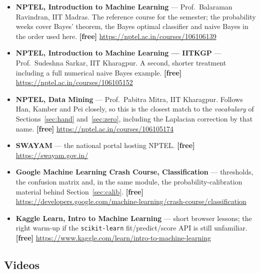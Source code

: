 \documentclass[11pt]{article}
\begin{document}
\begin{sloppypar}
\begin{itemize}[leftmargin=*]
  \item \textbf{NPTEL, Introduction to Machine Learning} --- Prof.\ Balaraman
    Ravindran, IIT Madras. The reference course for the semester; the
    probability weeks cover Bayes' theorem, the Bayes optimal classifier and
    naive Bayes in the order used here. \textbf{[free]}
    \url{https://nptel.ac.in/courses/106106139}
  \item \textbf{NPTEL, Introduction to Machine Learning --- IITKGP} ---
    Prof.\ Sudeshna Sarkar, IIT Kharagpur. A second, shorter treatment
    including a full numerical naive Bayes example. \textbf{[free]}
    \url{https://nptel.ac.in/courses/106105152}
  \item \textbf{NPTEL, Data Mining} --- Prof.\ Pabitra Mitra, IIT Kharagpur.
    Follows Han, Kamber and Pei closely, so this is the closest match to the
    \emph{vocabulary} of Sections~\ref{sec:hand} and~\ref{sec:zero},
    including the Laplacian correction by that name. \textbf{[free]}
    \url{https://nptel.ac.in/courses/106105174}
  \item \textbf{SWAYAM} --- the national portal hosting NPTEL.
    \textbf{[free]} \url{https://swayam.gov.in/}
  \item \textbf{Google Machine Learning Crash Course, Classification} ---
    thresholds, the confusion matrix and, in the same module, the
    probability-calibration material behind Section~\ref{sec:calib}.
    \textbf{[free]}
    \url{https://developers.google.com/machine-learning/crash-course/classification}
  \item \textbf{Kaggle Learn, Intro to Machine Learning} --- short browser
    lessons; the right warm-up if the \texttt{scikit-learn}
    fit/predict/score API is still unfamiliar. \textbf{[free]}
    \url{https://www.kaggle.com/learn/intro-to-machine-learning}
\end{itemize}
\end{sloppypar}

\subsection*{Videos}
\end{document}
